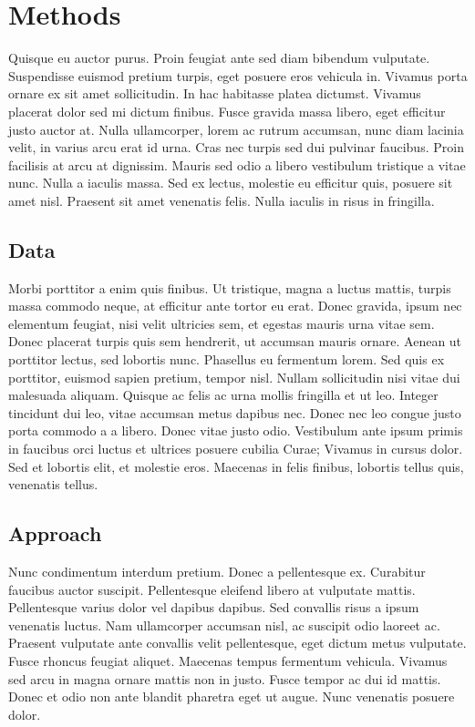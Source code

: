 \documentclass[10pt,conference]{ieeeconf}
\begin{document}
\section{Methods} \label{method}

Quisque eu auctor purus. Proin feugiat ante sed diam bibendum vulputate. Suspendisse euismod pretium turpis, eget posuere eros vehicula in. Vivamus porta ornare ex sit amet sollicitudin. In hac habitasse platea dictumst. Vivamus placerat dolor sed mi dictum finibus. Fusce gravida massa libero, eget efficitur justo auctor at. Nulla ullamcorper, lorem ac rutrum accumsan, nunc diam lacinia velit, in varius arcu erat id urna. Cras nec turpis sed dui pulvinar faucibus. Proin facilisis at arcu at dignissim. Mauris sed odio a libero vestibulum tristique a vitae nunc. Nulla a iaculis massa. Sed ex lectus, molestie eu efficitur quis, posuere sit amet nisl. Praesent sit amet venenatis felis. Nulla iaculis in risus in fringilla.

\subsection{Data}

Morbi porttitor a enim quis finibus. Ut tristique, magna a luctus mattis, turpis massa commodo neque, at efficitur ante tortor eu erat. Donec gravida, ipsum nec elementum feugiat, nisi velit ultricies sem, et egestas mauris urna vitae sem. Donec placerat turpis quis sem hendrerit, ut accumsan mauris ornare. Aenean ut porttitor lectus, sed lobortis nunc. Phasellus eu fermentum lorem. Sed quis ex porttitor, euismod sapien pretium, tempor nisl. Nullam sollicitudin nisi vitae dui malesuada aliquam. Quisque ac felis ac urna mollis fringilla et ut leo. Integer tincidunt dui leo, vitae accumsan metus dapibus nec. Donec nec leo congue justo porta commodo a a libero. Donec vitae justo odio. Vestibulum ante ipsum primis in faucibus orci luctus et ultrices posuere cubilia Curae; Vivamus in cursus dolor. Sed et lobortis elit, et molestie eros. Maecenas in felis finibus, lobortis tellus quis, venenatis tellus.

\subsection{Approach}

Nunc condimentum interdum pretium. Donec a pellentesque ex. Curabitur faucibus auctor suscipit. Pellentesque eleifend libero at vulputate mattis. Pellentesque varius dolor vel dapibus dapibus. Sed convallis risus a ipsum venenatis luctus. Nam ullamcorper accumsan nisl, ac suscipit odio laoreet ac. Praesent vulputate ante convallis velit pellentesque, eget dictum metus vulputate. Fusce rhoncus feugiat aliquet. Maecenas tempus fermentum vehicula. Vivamus sed arcu in magna ornare mattis non in justo. Fusce tempor ac dui id mattis. Donec et odio non ante blandit pharetra eget ut augue. Nunc venenatis posuere dolor.
\end{document}
